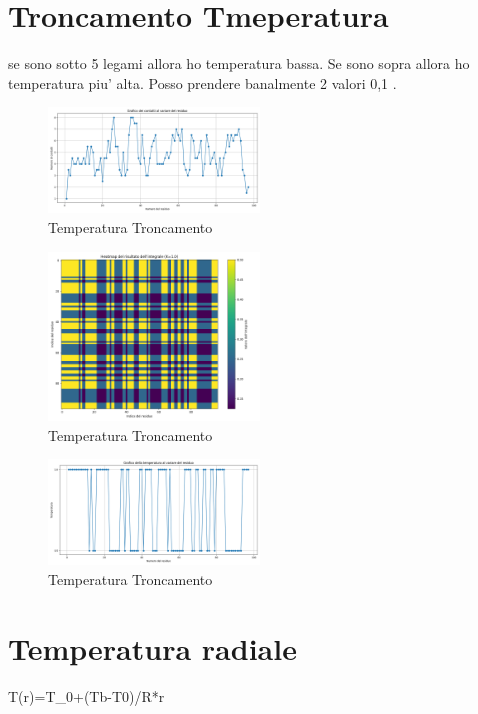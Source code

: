 \documentclass[Lau,binding=0.6cm,oneside,noexaminfo]{sapthesis}
\begin{document}
\section{Troncamento Tmeperatura}
se sono sotto 5 legami allora ho temperatura bassa.
Se sono sopra allora ho temperatura piu' alta.
Posso prendere banalmente 2 valori 0,1 .
\begin{figure}[H]
    \centering
    \includegraphics[width=0.5\textwidth]{"images/2m10_2_temperature_contact_cutoff.png"}
    \caption{ Temperatura Troncamento }
\end{figure}
\begin{figure}[H]
    \centering
    \includegraphics[width=0.5\textwidth]{"images/2m10_2_temperature_correlation_cutoff.png"}
    \caption{ Temperatura Troncamento  }
\end{figure}
\begin{figure}[H]
    \centering
    \includegraphics[width=0.5\textwidth]{"images/2m10_2_temperature_cutoff.png"}
    \caption{ Temperatura Troncamento  }
\end{figure}

\section{Temperatura radiale}
T(r)=T_0+(Tb-T0)/R*r
\end{document}

